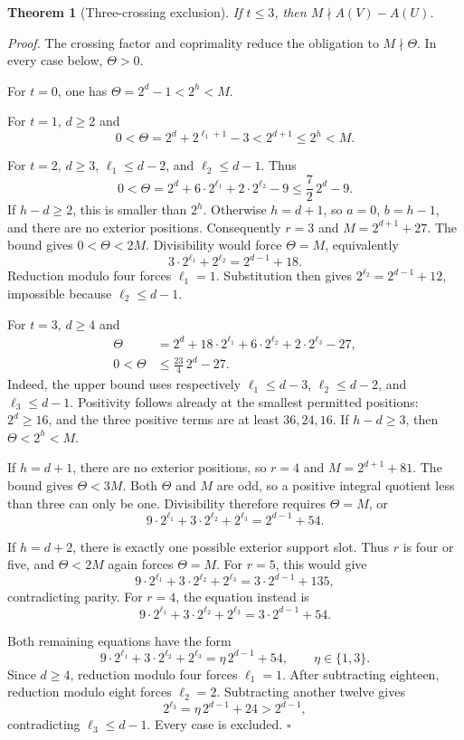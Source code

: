 \documentclass[11pt,letterpaper]{article}
\newtheorem{theorem}{Theorem}
\newenvironment{proof}{\noindent\textit{Proof.}}{\hfill\(\square\)}
\begin{document}
\begin{theorem}[Three-crossing exclusion]
If \(t\le3\), then \(M\nmid A(V)-A(U)\).
\end{theorem}
\begin{proof}
The crossing factor and coprimality reduce the obligation to
\(M\nmid\Theta\). In every case below, \(\Theta>0\).

For \(t=0\), one has \(\Theta=2^d-1<2^h<M\).

For \(t=1\), \(d\ge2\) and
\[
0<\Theta=2^d+2^{\ell_1+1}-3<2^{d+1}\le2^h<M.
\]

For \(t=2\), \(d\ge3\), \(\ell_1\le d-2\), and \(\ell_2\le d-1\).
Thus
\[
0<\Theta=2^d+6\cdot2^{\ell_1}+2\cdot2^{\ell_2}-9
\le\frac72\,2^d-9.
\]
If \(h-d\ge2\), this is smaller than \(2^h\).
Otherwise \(h=d+1\), so \(a=0\), \(b=h-1\), and there are no exterior
positions. Consequently \(r=3\) and \(M=2^{d+1}+27\).
The bound gives \(0<\Theta<2M\). Divisibility would force
\(\Theta=M\), equivalently
\[
3\cdot2^{\ell_1}+2^{\ell_2}=2^{d-1}+18.
\]
Reduction modulo four forces \(\ell_1=1\). Substitution then gives
\(2^{\ell_2}=2^{d-1}+12\), impossible because \(\ell_2\le d-1\).

For \(t=3\), \(d\ge4\) and
\[
\begin{aligned}
\Theta&=2^d+18\cdot2^{\ell_1}
              +6\cdot2^{\ell_2}+2\cdot2^{\ell_3}-27,\\
0<\Theta&\le\frac{23}{4}\,2^d-27.
\end{aligned}
\]
Indeed, the upper bound uses respectively
\(\ell_1\le d-3\), \(\ell_2\le d-2\), and \(\ell_3\le d-1\).
Positivity follows already at the smallest permitted positions:
\(2^d\ge16\), and the three positive terms are at least \(36,24,16\).
If \(h-d\ge3\), then \(\Theta<2^h<M\).

If \(h=d+1\), there are no exterior positions, so \(r=4\) and
\(M=2^{d+1}+81\). The bound gives \(\Theta<3M\). Both \(\Theta\) and
\(M\) are odd, so a positive integral quotient less than three can
only be one. Divisibility therefore requires \(\Theta=M\), or
\[
9\cdot2^{\ell_1}+3\cdot2^{\ell_2}+2^{\ell_3}=2^{d-1}+54.
\]

If \(h=d+2\), there is exactly one possible exterior support slot.
Thus \(r\) is four or five, and \(\Theta<2M\) again forces
\(\Theta=M\). For \(r=5\), this would give
\[
9\cdot2^{\ell_1}+3\cdot2^{\ell_2}+2^{\ell_3}
=3\cdot2^{d-1}+135,
\]
contradicting parity. For \(r=4\), the equation instead is
\[
9\cdot2^{\ell_1}+3\cdot2^{\ell_2}+2^{\ell_3}
=3\cdot2^{d-1}+54.
\]

Both remaining equations have the form
\[
9\cdot2^{\ell_1}+3\cdot2^{\ell_2}+2^{\ell_3}
=\eta\,2^{d-1}+54,\qquad \eta\in\{1,3\}.
\]
Since \(d\ge4\), reduction modulo four forces \(\ell_1=1\).
After subtracting eighteen, reduction modulo eight forces
\(\ell_2=2\). Subtracting another twelve gives
\[
2^{\ell_3}=\eta\,2^{d-1}+24>2^{d-1},
\]
contradicting \(\ell_3\le d-1\). Every case is excluded.
\end{proof}
\end{document}
